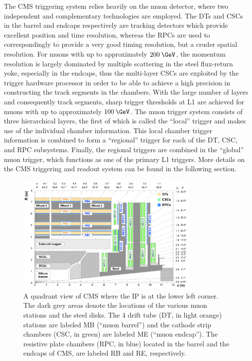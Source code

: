 The CMS triggering system relies heavily on the muon detector, where two independent and complementary technologies are employed. The DTs and CSCs in the barrel and endcaps respectively are tracking detectors which provide excellent position and time resolution, whereas the RPCs are used to correspondingly to provide a very good timing resolution, but a cruder spatial resolution. For muons with \pt up to approximately $200\:\GeV$, the momentum resolution is largely dominated by multiple scattering in the steel flux-return yoke, especially in the endcaps, thus the multi-layer CSCs are exploited by the trigger hardware processor in order to be able to achieve a high precision in constructing the track segments in the chambers. With the large number of layers and consequently track segments, sharp \pt trigger thresholds at L1 are achieved for muons with \pt up to approximately $100\:\GeV$. The muon trigger system consists of three hierarchical layers, the first of which is called the ``local'' trigger and makes use of the individual chamber information. This local chamber trigger information is combined to form a ``regional'' trigger for each of the DT, CSC, and RPC subsystems. Finally, the regional triggers are combined in the ``global'' muon trigger, which functions as one of the primary L1 triggers. More details on the CMS triggering and readout system can be found in the following section.
\begin{figure}
  \centering
  \includegraphics[width=0.8\textwidth]{figs/muonsys}
  \caption{A quadrant view of CMS where the IP is at the lower left corner. The dark grey areas denote the locations of the various muon stations and the steel disks. The 4 drift tube (DT, in light orange) stations are labeled MB (“muon barrel”) and the cathode strip chambers (CSC, in green) are labeled ME (“muon endcap”). The resistive plate chambers (RPC, in blue) located in the barrel and the endcaps of CMS, are labeled RB and RE, respectively.}
\label{fig:muondet}
\end{figure}

